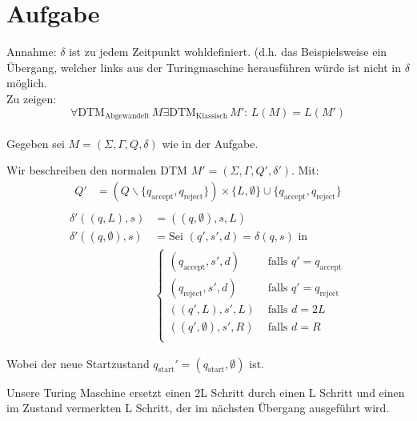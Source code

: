 \documentclass{article}
\newcounter{AufgabenCounter}
\newcounter{TeilaufgabenCounter}
\newenvironment{aufgabe}{\section*{Aufgabe \theAufgabenCounter}\setcounter{TeilaufgabenCounter}{1}}{\stepcounter{AufgabenCounter}}
\begin{document}
\begin{aufgabe}
  Annahme: $\delta$ ist zu jedem Zeitpunkt wohldefiniert. (d.h. das Beispielsweise ein Übergang, welcher links aus der Turingmaschine herausführen würde ist nicht in $\delta$ möglich.\\
  Zu zeigen: $$\forall \text{DTM}_\text{Abgewandelt}\,M\exists \text{DTM}_\text{Klassisch}\,M':\, L(M)=L(M')$$\\
  Gegeben sei $M=(\Sigma,\Gamma,Q,\delta)$ wie in der Aufgabe.

  Wir beschreiben den normalen DTM $M'=(\Sigma,\Gamma,Q',\delta')$. Mit:
  \begin{equation*}
    \begin{aligned}
      Q' & = (Q \backslash \{q_{\text{accept}},q_{\text{reject}}\}) \times \{L,\emptyset\} \cup \{q_{\text{accept}},q_{\text{reject}}\} \\
    \end{aligned}
  \end{equation*}
  \begin{equation*}
    \begin{aligned}
      \delta'((q,L),s)         & = ((q,\emptyset),s,L)                                                                     \\
      \delta'((q,\emptyset),s) & = \text{Sei } (q',s',d)=\delta(q,s) \text{ in }                                           \\
                               & \left\{\begin{aligned}
                                          (q_{\text{accept}},s',d) & \text{ falls } q' = q_{\text{accept}} \\
                                          (q_{\text{reject}},s',d) & \text{ falls } q' = q_{\text{reject}} \\
                                          ((q',L),s',L)            & \text{ falls } d = 2L                 \\
                                          ((q',\emptyset),s',R)    & \text{ falls } d = R                  \\
                                        \end{aligned}\right.
    \end{aligned}
  \end{equation*}

  Wobei der neue Startzustand $q_{\text{start}}'=(q_{\text{start}},\emptyset)$ ist.

  Unsere Turing Maschine ersetzt einen 2L Schritt durch einen L Schritt und einen im Zustand vermerkten L Schritt, der im nächsten Übergang ausgeführt wird.\\


\end{aufgabe}
\end{document}
